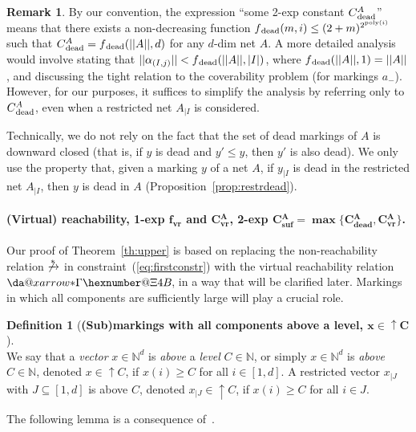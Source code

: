 \documentclass[11pt,a4paper]{amsart}
\makeatletter
\newcommand{\step}[1]{\mathrel{\xrightarrow{#1}}}
\newcommand{\reach}{\step{*}}
\newcommand{\virtual}[1]{\mathrel{\xdashrightarrow{#1}}\hspace{-0.3em}}
\newcommand{\vreach}{\virtual{*}}
\newcommand{\nnorm}[1]{||#1||}
\newcommand{\bvr}{{}_\textbf{vr}}
\newcommand{\upC}[1]{\mathop{\uparrow}#1}
\newcommand{\dead}{{}_\textnormal{dead}}
\newcommand{\bdead}{{}_\textbf{dead}}
\newcommand{\bsuf}{{}_\textbf{suf}}
\newcommand{\Nat}{\mathbb{N}}
\newcommand{\restr}[1]{_{|{#1}}}
\newcommand{\setN}{\Nat}
\newcommand*{\da@rightarrow}{\mathchar"0\hexnumber@\symAMSa 4B }
\newcommand*{\xdashrightarrow}[2][]{%
  \mathrel{%
    \mathpalette{\da@xarrow{#1}{#2}{}\da@rightarrow{\,}{}}{}%
  }%
}
\newcommand*{\da@xarrow}[7]{%
  \sbox0{$\ifx#7\scriptstyle\scriptscriptstyle\else\scriptstyle\fi#5#1#6\m@th$}%
  \sbox2{$\ifx#7\scriptstyle\scriptscriptstyle\else\scriptstyle\fi#5#2#6\m@th$}%
  \sbox4{$#7\dabar@\m@th$}%
  \dimen@=\wd0 %
  \ifdim\wd2 >\dimen@
    \dimen@=\wd2 %
  \fi
  \count@=2 %
  \def\da@bars{\dabar@\dabar@}%
  \@whiledim\count@\wd4<\dimen@\do{%
    \advance\count@\@ne
    \expandafter\def\expandafter\da@bars\expandafter{%
      \da@bars
      \dabar@ 
    }%
  }%
  \mathrel{#3}%
  \mathrel{%
    \mathop{\da@bars}\limits
    \ifx\\#1\\%
    \else
      _{\copy0}%
    \fi
    \ifx\\#2\\%
    \else
      ^{\copy2}%
    \fi
  }%
  \mathrel{#4}%
}
\theoremstyle{plain}
\theoremstyle{definition}
\newtheorem{rem}[thm]{Remark}
\newtheorem{defi}[thm]{Definition}
\theoremstyle{defC}
\theoremstyle{thmC}
\makeatother
\begin{document}
\begin{rem}
By our convention, the expression ``some 2-exp constant $C\dead^A$''
	means that there exists a non-decreasing function $f\dead(m,i)\leq
	(2+m)^{2^{\text{poly}(i)}}$
such that $C\dead^A=f\dead(\nnorm{A},d)$ for
any $d$-dim net $A$.
A more detailed analysis would involve stating
that	$\nnorm{\alpha_{(I,j)}}< f\dead(\nnorm{A},|I|)$, where 
	$f\dead(\nnorm{A},1)=\nnorm{A}$, and discussing the tight
	relation to the coverability problem (for markings $a_-$). 
	However, for our  purposes, it suffices to simplify the
	analysis by referring only to
	$C\dead^A$, even when a restricted net $A\restr{I}$ is
	considered.

	Technically, we do not rely on the fact that the set of dead
	markings of $A$ is downward closed (that is, if $y$ is dead and $y'\leq y$,
	then $y'$ is also dead). We only use the property that,
	given a marking $y$ of a net $A$, 
if $y\restr{I}$ is dead in the
	restricted net $A\restr{I}$, then $y$ is dead in $A$
	(Proposition~\ref{prop:restrdead}).
\end{rem}

\paragraph{(Virtual) reachability, 1-exp
$\bm{f\bvr}$ and $\bm{C\bvr^A}$, 2-exp $\bm{C\bsuf^A=\max\{C\bdead^A,C\bvr^A\}}$.}
Our proof of Theorem~\ref{th:upper} is based on replacing
the non-reachability relation $\not\reach$ in 
constraint~(\ref{eq:firstconstr}) with the virtual reachability relation
$\vreach$, in a way that will be clarified later. 
Markings in which all components are sufficiently large will play a
crucial role.

\begin{defi}[\textbf{(Sub)markings with all components above a level,
	$\bm{x\in\upC{C}}$}]
\hfill\\
We say that a \emph{vector} $x\in\setN^d$ is \emph{above} a
\emph{level} $C\in\setN$, or simply
$x\in\setN^d$ is \emph{above} $C\in\setN$, denoted
 $x\in\upC{C}$,	if $x(i)\geq C$ for all $i\in[1,d]$.
	A restricted vector
	$x\restr{J}$ with 
	$J\subseteq[1,d]$ is above $C$,
	denoted $x\restr{J}\in\upC{C}$, if  $x(i)\geq C$ for all $i\in
	J$.
\end{defi}

\noindent
The following lemma is a consequence of~\cite[Lemma~5]{DBLP:conf/fsttcs/Leroux19}.
\end{document}
